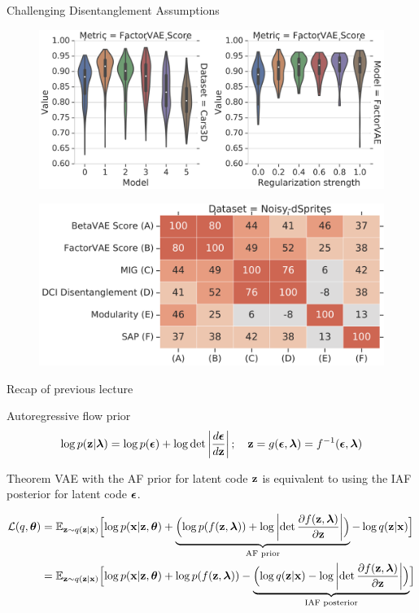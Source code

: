 \begin{frame}{Challenging Disentanglement Assumptions}
	\begin{figure}
		\centering
		\includegraphics[width=0.85\linewidth]{figs/challenge_dis_2}
	\end{figure}
	\vspace{-0.3cm}
	\begin{figure}
		\centering
		\includegraphics[width=0.65\linewidth]{figs/challenge_dis_3}
	\end{figure}

\end{frame}
\begin{frame}{Recap of previous lecture}
	\begin{block}{Autoregressive flow prior}
		\vspace{-0.5cm}
		\[
			\log p(\mathbf{z} | \boldsymbol{\lambda}) = \log p(\boldsymbol{\epsilon}) + \log \det \left | \frac{d \boldsymbol{\epsilon}}{d\mathbf{z}}\right|; \quad 
			\mathbf{z} = g(\boldsymbol{\epsilon}, \boldsymbol{\lambda}) = f^{-1}(\boldsymbol{\epsilon}, \boldsymbol{\lambda})
		\]
	\end{block}
	\vspace{-0.4cm}
	\begin{block}{Theorem}
	VAE with the AF prior for latent code $\mathbf{z}$ is equivalent to using the IAF posterior for latent code $\boldsymbol{\epsilon}$.
	\end{block}
	{\footnotesize
	\begin{align*}
		\mathcal{L}(q, \boldsymbol{\theta}) &= \mathbb{E}_{\mathbf{z} \sim q(\mathbf{z} | \mathbf{x})} \Bigl[ \log p(\mathbf{x} | \mathbf{z}, \boldsymbol{\theta}) + \underbrace{ \Bigl( \log p(f(\mathbf{z}, \boldsymbol{\lambda})) + \log \left| \det \frac{\partial f(\mathbf{z}, \boldsymbol{\lambda})}{\partial \mathbf{z}} \right| \Bigr) }_{\text{AF prior}} - \log q(\mathbf{z} | \mathbf{x}) \Bigr] \\
		&= \mathbb{E}_{\mathbf{z} \sim q(\mathbf{z} | \mathbf{x})} \Bigl[ \log p(\mathbf{x} | \mathbf{z}, \boldsymbol{\theta}) +  \log p(f(\mathbf{z}, \boldsymbol{\lambda})) - \underbrace{ \Bigl( \log q(\mathbf{z} | \mathbf{x}) - \log \left| \det \frac{\partial f(\mathbf{z}, \boldsymbol{\lambda})}{\partial \mathbf{z}} \right| \Bigr) }_{\text{IAF posterior}} \Bigr]
	\end{align*}
	}
\end{frame}
